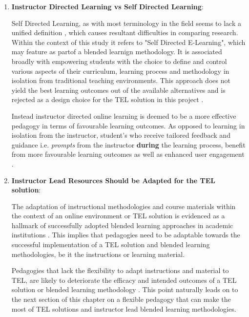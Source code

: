 \begin{enumerate}

    \item \textbf{Instructor Directed Learning vs Self Directed Learning}:
    
    Self Directed Learning, as with most terminology in  the field seems to lack a unified definition \cite{OShea2003,Hiemstra2006}, which causes resultant difficulties in comparing research. Within the context of this study it refers to "Self Directed E-Learning", which may feature as partof a blended learnign methodology. It is associated broadly with empowering students with the choice to define and control various aspects of their curriculum, learning process and methodology in isolation \cite{Hiemstra2006,Means2009,RickReis,Team2008} from traditional teaching environments. This approach does not yield the best learning outcomes out of the available alternatives and is rejected as a design choice for the TEL solution in this project \cite{RickReis,Team2008}. 
    
    Instead instructor directed online learning is deemed to be a more effective pedagogy in terms of favourable learning outcomes. As opposed to learning in isolation from the instructor, student's who receive tailored feedback and guidance  i.e. \textit{prompts} from the instructor \textbf{during} the learning process, benefit from more favourable learning outcomes as well as enhanced user engagement \cite{RickReis,Team2008,Means2009}.

\newpage

    \item \textbf{Instructor Lead Resources Should be Adapted for the TEL solution}:
    
    The adaptation of instructional methodologies and course materials within the context of an online environment or TEL solution is evidenced as a hallmark of successfully adopted blended learning approaches in academic institutions \cite{Means2009,Team2008,RickReis}. This implies that pedagogies need to be adaptable towards the successful implementation of a TEL solution and blended learning methodologies, be it the instructions or learning material.
    
    Pedagogies that lack the flexibility to adapt instructions and material to TEL, are likely to deteriorate the efficacy and intended outcomes of a TEL solution or blended learning methodology \cite{RickReis,Team2008,Means2009}. This point naturally leads on to the next section of this chapter on a flexible pedagogy that can make the most of TEL solutions and instructor lead blended learning methodologies.
\end{enumerate}


